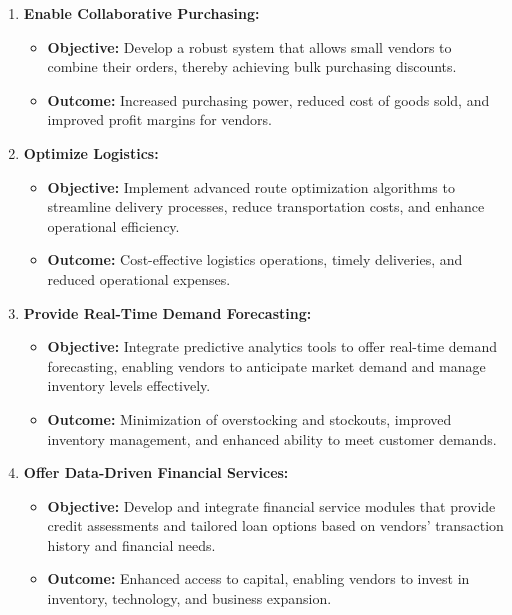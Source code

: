 \begin{enumerate}
    \item \textbf{Enable Collaborative Purchasing:}
    \begin{itemize}
        \item \textbf{Objective:} Develop a robust system that allows small vendors to combine their orders, thereby achieving bulk purchasing discounts.
        \item \textbf{Outcome:} Increased purchasing power, reduced cost of goods sold, and improved profit margins for vendors.
    \end{itemize}
    
    \item \textbf{Optimize Logistics:}
    \begin{itemize}
        \item \textbf{Objective:} Implement advanced route optimization algorithms to streamline delivery processes, reduce transportation costs, and enhance operational efficiency.
        \item \textbf{Outcome:} Cost-effective logistics operations, timely deliveries, and reduced operational expenses.
    \end{itemize}
    
    \item \textbf{Provide Real-Time Demand Forecasting:}
    \begin{itemize}
        \item \textbf{Objective:} Integrate predictive analytics tools to offer real-time demand forecasting, enabling vendors to anticipate market demand and manage inventory levels effectively.
        \item \textbf{Outcome:} Minimization of overstocking and stockouts, improved inventory management, and enhanced ability to meet customer demands.
    \end{itemize}
    
    \item \textbf{Offer Data-Driven Financial Services:}
    \begin{itemize}
        \item \textbf{Objective:} Develop and integrate financial service modules that provide credit assessments and tailored loan options based on vendors’ transaction history and financial needs.
        \item \textbf{Outcome:} Enhanced access to capital, enabling vendors to invest in inventory, technology, and business expansion.
    \end{itemize}
    

\end{enumerate}
